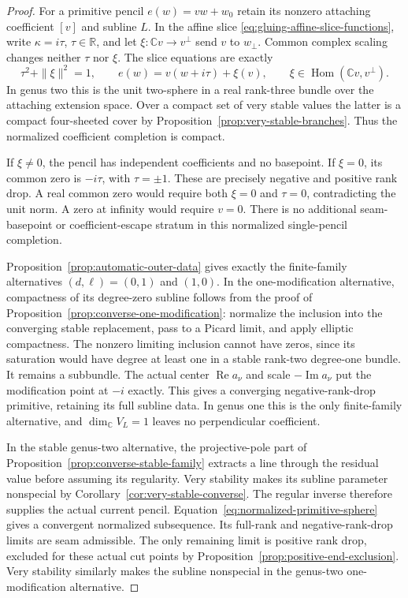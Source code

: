 \documentclass[11pt]{amsart}
\theoremstyle{definition}
\theoremstyle{remark}
\theoremstyle{plain}
\begin{document}
\begin{proof}
For a primitive pencil $e(w)=vw+w_0$ retain its nonzero attaching
coefficient $[v]$ and subline $L$. In the affine slice
\eqref{eq:gluing-affine-slice-functions}, write
$\kappa=i\tau$, $\tau\in\mathbb R$, and let
$\xi:\mathbb Cv\to v^\perp$ send $v$ to $w_\perp$.
Common complex scaling changes neither $\tau$ nor $\xi$.
The slice equations are exactly
\begin{equation}\label{eq:normalized-primitive-sphere}
 \tau^2+\|\xi\|^2=1,\qquad
 e(w)=v(w+i\tau)+\xi(v),\qquad
 \xi\in\operatorname{Hom}(\mathbb Cv,v^\perp).
\end{equation}
In genus two this is the unit two-sphere in a real rank-three
bundle over the attaching extension space. Over a compact set
of very stable values the latter is a compact four-sheeted
cover by Proposition~\ref{prop:very-stable-branches}.
Thus the normalized coefficient completion is compact.

If $\xi\ne0$, the pencil has independent coefficients and
no basepoint. If $\xi=0$, its common zero is $-i\tau$, with
$\tau=\pm1$. These are precisely negative and positive
rank drop. A real common zero would require both
$\xi=0$ and $\tau=0$, contradicting the unit norm.
A zero at infinity would require $v=0$.
There is no additional seam-basepoint or coefficient-escape
stratum in this normalized single-pencil completion.

Proposition~\ref{prop:automatic-outer-data} gives exactly
the finite-family alternatives $(d,\ell)=(0,1)$ and $(1,0)$.
In the one-modification alternative, compactness of its
degree-zero subline follows from the proof of
Proposition~\ref{prop:converse-one-modification}:
normalize the inclusion into the converging stable replacement,
pass to a Picard limit, and apply elliptic compactness.
The nonzero limiting inclusion cannot have zeros, since
its saturation would have degree at least one in a stable
rank-two degree-one bundle. It remains a subbundle.
The actual center $\operatorname{Re}a_\nu$ and scale
$-\operatorname{Im}a_\nu$ put the modification point at
$-i$ exactly. This gives a converging negative-rank-drop
primitive, retaining its full subline data. In genus one
this is the only finite-family alternative, and
$\dim_\mathbb C V_L=1$ leaves no perpendicular coefficient.

In the stable genus-two alternative, the projective-pole
part of Proposition~\ref{prop:converse-stable-family}
extracts a line through the residual value before assuming
its regularity. Very stability makes its subline parameter
nonspecial by Corollary~\ref{cor:very-stable-converse}.
The regular inverse therefore supplies the actual current
pencil. Equation~\eqref{eq:normalized-primitive-sphere}
gives a convergent normalized subsequence. Its full-rank
and negative-rank-drop limits are seam admissible.
The only remaining limit is positive rank drop, excluded
for these actual cut points by
Proposition~\ref{prop:positive-end-exclusion}.
Very stability similarly makes the subline nonspecial
in the genus-two one-modification alternative.


\end{proof}
\end{document}
